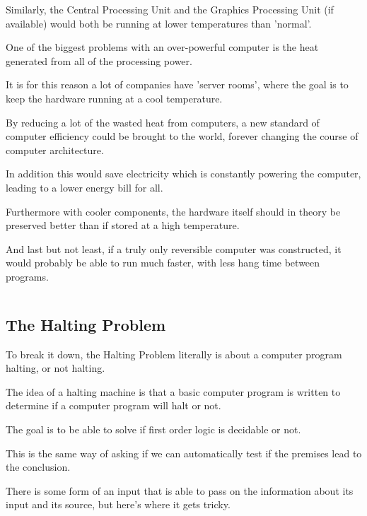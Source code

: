\documentclass{article}
\begin{document}
\medskip\noindent
Similarly, the Central Processing Unit and the Graphics Processing Unit (if available) would both be running at lower temperatures than 'normal'. 

\medskip\noindent
One of the biggest problems with an over-powerful computer is the heat generated from all of the processing power. 

\medskip\noindent
It is for this reason a lot of companies have 'server rooms', where the goal is to keep the hardware running at a cool temperature. 

\medskip\noindent
By reducing a lot of the wasted heat from computers, a new standard of computer efficiency could be brought to the world, forever changing the course of computer architecture.

\medskip\noindent
In addition this would save electricity which is constantly powering the computer, leading to a lower energy bill for all. 

\medskip\noindent
Furthermore with cooler components, the hardware itself should in theory be preserved better than if stored at a high temperature. 

\medskip\noindent
And last but not least, if a truly only reversible computer was constructed, it would probably be able to run much faster, with less hang time between programs. 

\medskip\medskip
\begin{lstlisting}
\end{lstlisting}

\medskip

\subsection{The Halting Problem}
\medskip\medskip
\hspace{\parindent} 

To break it down, the Halting Problem literally is about a computer program halting, or not halting. 

\medskip\noindent
The idea of a halting machine is that a basic computer program is written to determine if a computer program will halt or not. 

\medskip\noindent
The goal is to be able to solve if first order logic is decidable or not. 

\medskip\noindent
This is the same way of asking if we can automatically test if the premises lead to the conclusion. 

\medskip\noindent
\cite{HP} There is some form of an input that is able to pass on the information about its input and its source, but here's where it gets tricky.
\end{document}
